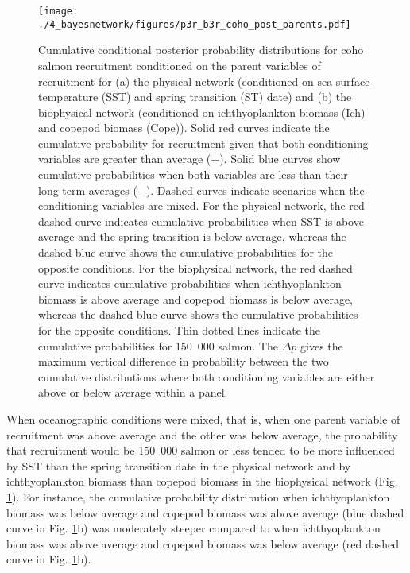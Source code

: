 \begin{figure}[htbp]
  \centering \texttt{[image: ./4\_bayesnetwork/figures/p3r\_b3r\_coho\_post\_parents.pdf]}
  \caption[Cumulative conditional posterior probability distributions for coho
           salmon recruitment conditioned on the parent variables of
           recruitment]{Cumulative conditional posterior probability
           distributions for coho salmon recruitment conditioned on the parent
           variables of recruitment for (a) the physical network (conditioned on
           sea surface temperature (SST) and spring transition (ST) date) and
           (b) the biophysical network (conditioned on ichthyoplankton biomass
           (Ich) and copepod biomass (Cope)). Solid red curves indicate
           the cumulative probability for recruitment given that both
           conditioning variables are greater than average (+). Solid
           blue curves show cumulative probabilities when both variables are
           less than their long-term averages ($-$). Dashed curves indicate
           scenarios when the conditioning variables are mixed. For the physical
           network, the red dashed curve indicates cumulative probabilities
           when SST is above average and the spring transition is below average,
           whereas the dashed blue curve shows the cumulative probabilities for
           the opposite conditions. For the biophysical network, the red dashed
           curve indicates cumulative probabilities when ichthyoplankton biomass
           is above average and copepod biomass is below average, whereas the
           dashed blue curve shows the cumulative probabilities for the
           opposite conditions. Thin dotted lines indicate the cumulative
           probabilities for 150~000 salmon.  The \(\Delta p\) gives the maximum
           vertical difference in probability between the two cumulative
           distributions where both conditioning variables are either above or
           below average within a panel.}
  \label{fig:bn:8}
\end{figure}

When oceanographic conditions were mixed, that is, when one parent variable of
recruitment was above average and the other was below average, the probability
that recruitment would be 150~000 salmon or less tended to be more influenced by
SST than the spring transition date in the physical network and by
ichthyoplankton biomass than copepod biomass in the biophysical network (Fig.
\ref{fig:bn:8}). For instance, the cumulative probability distribution when
ichthyoplankton biomass was below average and copepod biomass was above average
(blue dashed curve in Fig. \ref{fig:bn:8}b) was moderately steeper compared to
when ichthyoplankton biomass was above average and copepod biomass was below
average (red dashed curve in Fig. \ref{fig:bn:8}b).


